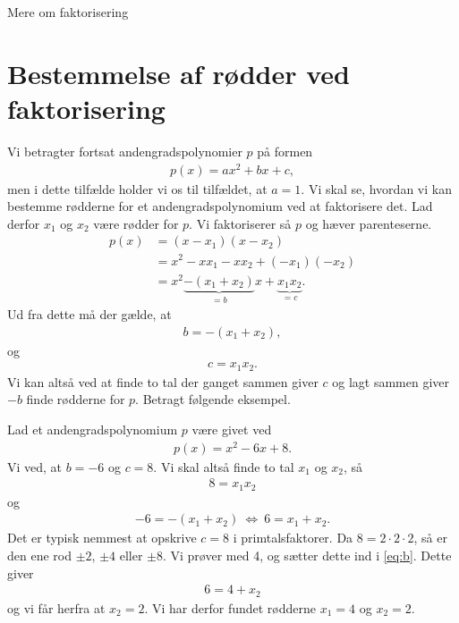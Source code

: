 
\begin{center}
\Huge
	Mere om faktorisering
\end{center}
\section*{Bestemmelse af rødder ved faktorisering}

Vi betragter fortsat andengradspolynomier $p$ på formen
\begin{align*}
	p(x) = ax^2 + bx + c,
\end{align*}
men i dette tilfælde holder vi os til tilfældet, at $a = 1$. Vi skal se, hvordan vi kan bestemme rødderne for et andengradspolynomium ved at faktorisere det. Lad derfor $x_1$ og $x_2$ være rødder for $p$. Vi faktoriserer så $p$ og hæver parenteserne.
\begin{align*}
	p(x) &= (x-x_1)(x-x_2)\\
	&= x^2 -xx_1 - xx_2 + (-x_1)(-x_2)\\
	&= x^2 \underbrace{- (x_1+x_2)}_{=b}x + \underbrace{x_1x_2}_{=c}.
\end{align*}
Ud fra dette må der gælde, at 
\begin{align*}
	b = -(x_1 + x_2),
\end{align*}
og
\begin{align*}
	c = x_1x_2.
\end{align*}
Vi kan altså ved at finde to tal der ganget sammen giver $c$ og lagt sammen giver $-b$ finde rødderne for $p$. Betragt følgende eksempel.
\begin{exa}
	Lad et andengradspolynomium $p$ være givet ved
	\begin{align*}
		p(x) = x^2 - 6x + 8.
	\end{align*}
	Vi ved, at $b = -6$ og $c = 8$. Vi skal altså finde to tal $x_1$ og $x_2$, så
	\begin{align*}
		8 = x_1x_2
	\end{align*}
	og
	\begin{align}\label{eq:b}
		-6 = -(x_1 + x_2)\ \Leftrightarrow \ 6 = x_1 + x_2.
	\end{align}
	Det er typisk nemmest at opskrive $c = 8$ i primtalsfaktorer. Da $8 = 2\cdot 2 \cdot 2$, så er den ene rod 
	$\pm 2$, $\pm 4$ eller $\pm 8$.
	Vi prøver med 4, og sætter dette ind i \eqref{eq:b}. Dette giver
	\begin{align*}
		6 = 4 + x_2
	\end{align*}
	og vi får herfra at $x_2 = 2$. Vi har derfor fundet rødderne $x_1 = 4$ og $x_2 = 2$.  
\end{exa}

